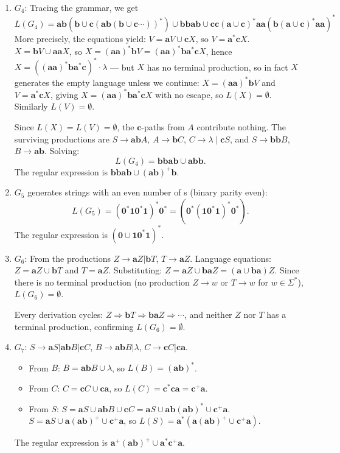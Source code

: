 \begin{enumerate}[{8.}1. ]
\begin{enumerate}
\item $G_4$: Tracing the grammar, we get
\[
L(G_4) = \pmb{ab}(\pmb{b}\cup\pmb{c}(\pmb{ab}(\pmb{b}\cup\pmb{c}\cdots))^*) \cup \pmb{bbab} \cup \pmb{cc}(\pmb{a}\cup\pmb{c})^*\pmb{aa}(\pmb{b}(\pmb{a}\cup\pmb{c})^*\pmb{aa})^*
\]
More precisely, the equations yield:
$V = \pmb{a}V \cup \pmb{c}X$, so $V = \pmb{a}^*\pmb{c}X$.
$X = \pmb{b}V \cup \pmb{aa}X$, so $X = (\pmb{aa})^*\pmb{b}V = (\pmb{aa})^*\pmb{b}\pmb{a}^*\pmb{c}X$, hence $X = ((\pmb{aa})^*\pmb{b}\pmb{a}^*\pmb{c})^*\cdot\lambda$ --- but $X$ has no terminal production, so in fact $X$ generates the empty language unless we continue: $X = (\pmb{aa})^*\pmb{b}V$ and $V = \pmb{a}^*\pmb{c}X$, giving $X = (\pmb{aa})^*\pmb{b}\pmb{a}^*\pmb{c}X$ with no escape, so $L(X) = \emptyset$. Similarly $L(V)=\emptyset$.

Since $L(X)=L(V)=\emptyset$, the $\pmb{c}$-paths from $A$ contribute nothing. The surviving productions are $S\to\pmb{ab}A$, $A\to\pmb{b}C$, $C\to\lambda\mid\pmb{c}S$, and $S\to\pmb{bb}B$, $B\to\pmb{ab}$. Solving:
\[
L(G_4) = \pmb{bbab} \cup \pmb{abb}.
\]
The regular expression is $\pmb{bbab} \cup (\pmb{ab})^+\pmb{b}$.

\item $G_5$ generates strings with an even number of s (binary parity even):
\[
L(G_5) = (\pmb{0}^*\pmb{1}\pmb{0}^*\pmb{1})^*\pmb{0}^* = (\pmb{0}^*(\pmb{10}^*\pmb{1})^*\pmb{0}^*).
\]
The regular expression is $(\pmb{0}\cup\pmb{10}^*\pmb{1})^*$.

\item $G_6$: From the productions $Z \to \pmb{a}Z | \pmb{b}T$, $T \to \pmb{a}Z$. Language equations: $Z = \pmb{a}Z \cup \pmb{b}T$ and $T = \pmb{a}Z$. Substituting: $Z = \pmb{a}Z \cup \pmb{ba}Z = (\pmb{a}\cup\pmb{ba})Z$. Since there is no terminal production (no production $Z \to w$ or $T \to w$ for $w \in \Sigma^*$), $L(G_6) = \emptyset$.

Every derivation cycles: $Z \Rightarrow \pmb{b}T \Rightarrow \pmb{ba}Z \Rightarrow \cdots$, and neither $Z$ nor $T$ has a terminal production, confirming $L(G_6) = \emptyset$.

\item $G_7$: $S \to \pmb{a}S | \pmb{ab}B | \pmb{c}C$, $B \to \pmb{ab}B | \lambda$, $C \to \pmb{c}C | \pmb{ca}$.
\begin{itemize}
\item From $B$: $B = \pmb{ab}B \cup \lambda$, so $L(B) = (\pmb{ab})^*$.
\item From $C$: $C = \pmb{c}C \cup \pmb{ca}$, so $L(C) = \pmb{c}^*\pmb{ca} = \pmb{c}^+\pmb{a}$.
\item From $S$: $S = \pmb{a}S \cup \pmb{ab}B \cup \pmb{c}C = \pmb{a}S \cup \pmb{ab}(\pmb{ab})^* \cup \pmb{c}^+\pmb{a}$.
  $S = \pmb{a}S \cup \pmb{a}(\pmb{ab})^+\cup\pmb{c}^+\pmb{a}$, so $L(S) = \pmb{a}^*(\pmb{a}(\pmb{ab})^+ \cup \pmb{c}^+\pmb{a})$.
\end{itemize}
The regular expression is $\pmb{a}^+(\pmb{ab})^+ \cup \pmb{a}^*\pmb{c}^+\pmb{a}$.
\end{enumerate}


\end{enumerate}
